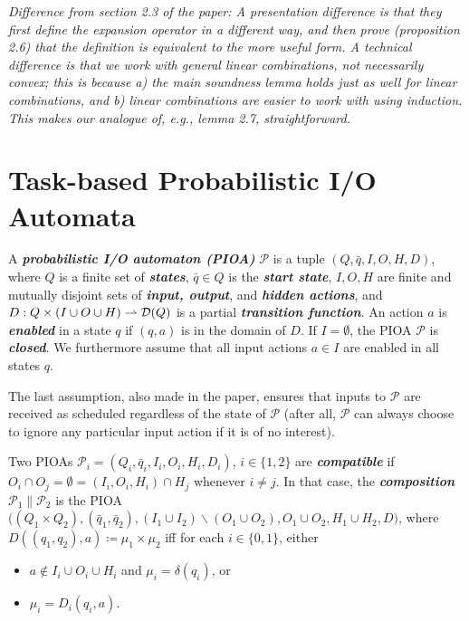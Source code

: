 \documentclass[10pt]{article}
\begin{document}
\medskip

{\small \em Difference from section 2.3 of the paper: A presentation difference is that they first define the expansion operator in a different way, and then prove (proposition 2.6) that the definition is equivalent to the more useful form. A technical difference is that we work with general linear combinations, not necessarily convex; this is because a) the main soundness lemma holds just as well for linear combinations, and b) linear combinations are easier to work with using induction. This makes our analogue of, \emph{e.g.}, lemma 2.7, straightforward.}



\section{Task-based Probabilistic I/O Automata}
\begin{definition}
A \textbf{\emph{probabilistic I/O automaton (PIOA)}} $\mathcal{P}$ is a tuple $(Q,\bar{q},I,O,H,D)$, where $Q$ is a finite set of \textbf{\emph{states}}, $\bar{q} \in Q$ is the \emph{\textbf{start state}}, $I,O,H$ are finite and mutually disjoint sets of \emph{\textbf{input, output}}, and \textbf{\emph{hidden actions}}, and $D : Q \times (I \cup O \cup H) \rightharpoonup \mathcal{D}(Q)$ is a partial \textbf{\emph{transition function}}. An action $a$ is \textbf{\emph{enabled}} in a state $q$ if $(q,a)$ is in the domain of $D$. If $I = \emptyset$, the PIOA $\mathcal{P}$ is \emph{\textbf{closed}}. We furthermore assume that all input actions $a \in I$ are enabled in all states $q$.
\end{definition}

The last assumption, also made in the paper, ensures that inputs to $\mathcal{P}$ are received as scheduled regardless of the state of $\mathcal{P}$ (after all, $\mathcal{P}$ can always choose to ignore any particular input action if it is of no interest). 
 
\begin{definition}
Two PIOAs $\mathcal{P}_i = (Q_i, \bar{q}_i, I_i,O_i,H_i,D_i)$, $i \in \{1,2\}$ are \emph{\textbf{compatible}} if $O_i \cap O_j = \emptyset = (I_i,O_i,H_i) \cap H_j$ whenever $i \neq j$. In that case, the \emph{\textbf{composition}} $\mathcal{P}_1 \parallel \mathcal{P}_2$ is the PIOA $\big((Q_1 \times Q_2), (\bar{q}_1,\bar{q}_2), (I_1 \cup I_2) \backslash (O_1 \cup O_2), O_1 \cup O_2, H_1 \cup H_2, D\big)$, where $D((q_1,q_2),a) \coloneqq \mu_1 \times \mu_2$ iff for each $i \in \{0,1\}$, either 
\begin{itemize}
\item $a \notin I_i \cup O_i \cup H_i$ and $\mu_i = \delta(q_i)$, or
\item $\mu_i = D_i(q_i,a)$.  
\end{itemize}
\end{definition}
\end{document}
